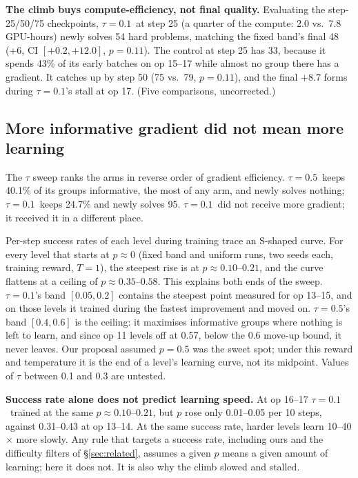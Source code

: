 \documentclass[11pt]{article}
\newcommand{\tauone}{$\tau{=}0.1$}
\newcommand{\taufive}{$\tau{=}0.5$}
\begin{document}
\textbf{The climb buys compute-efficiency, not final quality.} Evaluating the step-25/50/75 checkpoints,
\tauone\ at step 25 (a quarter of the compute: 2.0 vs.\ 7.8 GPU-hours) newly solves 54 hard problems, matching the
fixed band's final 48 (+6, CI $[+0.2,+12.0]$, $p=0.11$). The control at step 25 has 33, because it spends 43\% of its
early batches on op 15--17 while almost no group there has a gradient. It catches up by step 50 (75 vs.\ 79,
$p=0.11$), and the final $+8.7$ forms during \tauone's stall at op 17. (Five comparisons, uncorrected.)

\subsection{More informative gradient did not mean more learning}
\label{sec:signal}

The $\tau$ sweep ranks the arms in reverse order of gradient efficiency. \taufive\ keeps 40.1\% of its groups
informative, the most of any arm, and newly solves nothing; \tauone\ keeps 24.7\% and newly solves 95.
\tauone\ did not receive more gradient; it received it in a different place.

Per-step success rates of each level during training trace an S-shaped curve. For every level that starts
at $p\approx0$ (fixed band and uniform runs, two seeds each, training reward, $T=1$), the steepest rise is at
$p\approx0.10$--$0.21$, and the curve flattens at a ceiling of $p\approx0.35$--$0.58$. This explains both ends
of the sweep. \tauone's band $[0.05, 0.2]$ contains the steepest point measured for op 13--15, and on
those levels it trained during the fastest improvement and moved on. \taufive's band $[0.4, 0.6]$ is the ceiling: it
maximises informative groups where nothing is left to learn, and since op 11 levels off at 0.57, below the
0.6 move-up bound, it never leaves. Our proposal assumed $p=0.5$ was the sweet spot; under this reward and
temperature it is the end of a level's learning curve, not its midpoint. Values of $\tau$ between 0.1 and 0.3
are untested.

\textbf{Success rate alone does not predict learning speed.} At op 16--17 \tauone\ trained at the same
$p\approx0.10$--$0.21$, but $p$ rose only 0.01--0.05 per 10 steps, against 0.31--0.43 at op 13--14. At the
same success rate, harder levels learn 10--40$\times$ more slowly. Any rule that targets a success rate,
including ours and the difficulty filters of \S\ref{sec:related}, assumes a given $p$ means a given amount of
learning; here it does not. It is also why the climb slowed and stalled.
\end{document}
